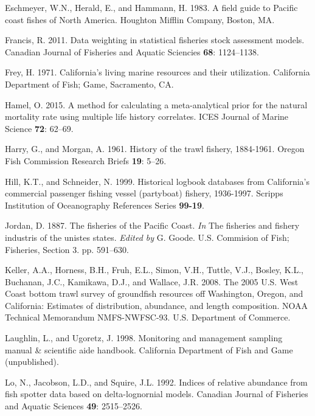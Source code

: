 \documentclass[12pt,]{article}
\begin{document}
\hypertarget{ref-Eschmeyer1983}{}
Eschmeyer, W.N., Herald, E., and Hammann, H. 1983. A field guide to
Pacific coast fishes of North America. Houghton Mifflin Company, Boston,
MA.

\hypertarget{ref-Francis2011}{}
Francis, R. 2011. Data weighting in statistical fisheries stock
assessment models. Canadian Journal of Fisheries and Aquatic Sciencies
\textbf{68}: 1124--1138.

\hypertarget{ref-Frey1971}{}
Frey, H. 1971. California's living marine resources and their
utilization. California Department of Fish; Game, Sacramento, CA.

\hypertarget{ref-Hamel2015}{}
Hamel, O. 2015. A method for calculating a meta-analytical prior for the
natural mortality rate using multiple life history correlates. ICES
Journal of Marine Science \textbf{72}: 62--69.

\hypertarget{ref-Harry1961}{}
Harry, G., and Morgan, A. 1961. History of the trawl fishery, 1884-1961.
Oregon Fish Commission Research Briefs \textbf{19}: 5--26.

\hypertarget{ref-Hill1999}{}
Hill, K.T., and Schneider, N. 1999. Historical logbook databases from
California's commercial passenger fishing vessel (partyboat) fishery,
1936-1997. Scripps Institution of Oceanography References Series
\textbf{99-19}.

\hypertarget{ref-Jordan1887}{}
Jordan, D. 1887. The fisheries of the Pacific Coast. \emph{In} The
fisheries and fishery industris of the unistes states. \emph{Edited by}
G. Goode. U.S. Commision of Fish; Fisheries, Section 3. pp. 591--630.

\hypertarget{ref-Keller2008}{}
Keller, A.A., Horness, B.H., Fruh, E.L., Simon, V.H., Tuttle, V.J.,
Bosley, K.L., Buchanan, J.C., Kamikawa, D.J., and Wallace, J.R. 2008.
The 2005 U.S. West Coast bottom trawl survey of groundfish resources off
Washington, Oregon, and California: Estimates of distribution,
abundance, and length composition. NOAA Technical Memorandum
NMFS-NWFSC-93. U.S. Department of Commerce.

\hypertarget{ref-Laughlin1998}{}
Laughlin, L., and Ugoretz, J. 1998. Monitoring and management sampling
manual \& scientific aide handbook. California Department of Fish and
Game (unpublished).

\hypertarget{ref-Lo1992}{}
Lo, N., Jacobson, L.D., and Squire, J.L. 1992. Indices of relative
abundance from fish spotter data based on delta-lognornial models.
Canadian Journal of Fisheries and Aquatic Sciences \textbf{49}:
2515--2526.
\end{document}
